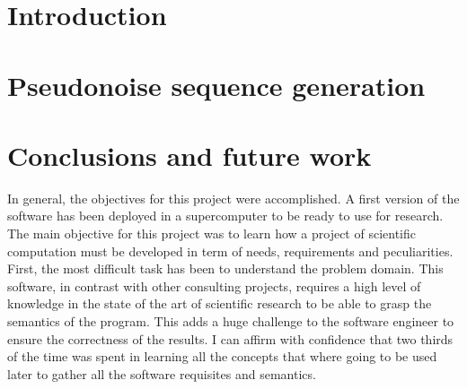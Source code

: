 \documentclass{tfg_domingo}
\begin{document}

\portada
\frontmatter
\gracias{}
\resumen{}{}
\tableofcontents

\mainmatter


\chapter{Introduction}



\chapter{Pseudonoise sequence generation}










\chapter{Conclusions and future work}

  In general, the objectives for this project were  accomplished. A first version
  of the software has been deployed in a supercomputer to be ready to use for
  research. The main objective  for this project was to learn how a project of
  scientific computation must be developed in term of  needs, requirements and
  peculiarities.\\

  First, the most difficult task has been to understand
  the problem domain. This software, in contrast with other consulting
  projects, requires a high level of knowledge in the state of the art of
  scientific research to be able to grasp the semantics of the program. This adds a
  huge challenge to the software engineer to ensure the correctness of the results.
  I can affirm with confidence that two thirds of the time was spent in learning
  all the concepts that where going to be used later to gather all the software
  requisites and semantics.\\
\end{document}
